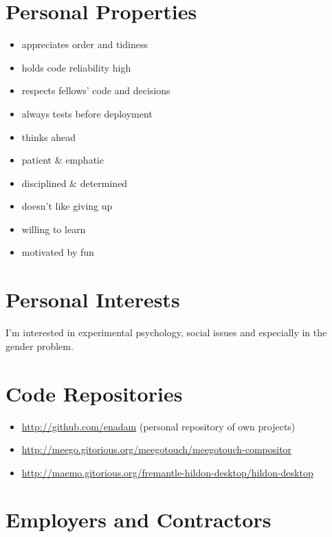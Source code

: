 \documentclass[a4paper,12pt]{article}
\newcommand{\compress}{\setlength\itemsep{-\parskip}}
\begin{document}
\section{Personal Properties}

\begin{multicols}{2}
\begin{itemize}\compress
\item	appreciates order and tidiness
\item	holds code reliability high
\item	respects fellows' code and decisions
\item	always tests before deployment
\item	thinks ahead
\columnbreak
\item	patient \& emphatic
\item	disciplined \& determined
\item	doesn't like giving up
\item	willing to learn
\item	motivated by fun
\end{itemize}
\end{multicols}

\section{Personal Interests}

I'm interested in experimental psychology, social issues and especially
in the gender problem.

\section{Code Repositories}

\begin{itemize}\compress
\item	\url{http://github.com/enadam} (personal repository of own projects)
\item	\url{http://meego.gitorious.org/meegotouch/meegotouch-compositor}
\item	\url{http://maemo.gitorious.org/fremantle-hildon-desktop/hildon-desktop}
\end{itemize}

\section{Employers and Contractors}
\end{document}
